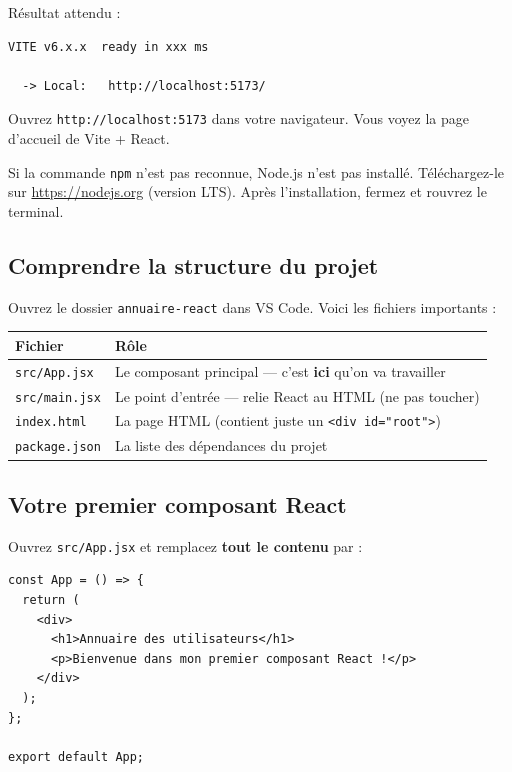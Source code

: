 \documentclass[11pt,a4paper]{article}
\begin{document}
Résultat attendu :
\begin{lstlisting}[style=terminal]
  VITE v6.x.x  ready in xxx ms

  -> Local:   http://localhost:5173/
\end{lstlisting}

Ouvrez \texttt{http://localhost:5173} dans votre navigateur. Vous voyez la page d'accueil de Vite + React.

\begin{attentionbox}
Si la commande \texttt{npm} n'est pas reconnue, Node.js n'est pas installé. Téléchargez-le sur \url{https://nodejs.org} (version LTS). Après l'installation, fermez et rouvrez le terminal.
\end{attentionbox}

\subsection{Comprendre la structure du projet}

Ouvrez le dossier \texttt{annuaire-react} dans VS Code. Voici les fichiers importants :

\begin{center}
\begin{tabular}{lp{8cm}}
\toprule
\textbf{Fichier} & \textbf{Rôle} \\
\midrule
\texttt{src/App.jsx} & Le composant principal --- c'est \textbf{ici} qu'on va travailler \\
\texttt{src/main.jsx} & Le point d'entrée --- relie React au HTML (ne pas toucher) \\
\texttt{index.html} & La page HTML (contient juste un \texttt{<div id="root">}) \\
\texttt{package.json} & La liste des dépendances du projet \\
\bottomrule
\end{tabular}
\end{center}

\subsection{Votre premier composant React}

Ouvrez \texttt{src/App.jsx} et remplacez \textbf{tout le contenu} par :

\begin{lstlisting}
const App = () => {
  return (
    <div>
      <h1>Annuaire des utilisateurs</h1>
      <p>Bienvenue dans mon premier composant React !</p>
    </div>
  );
};

export default App;
\end{lstlisting}
\end{document}

